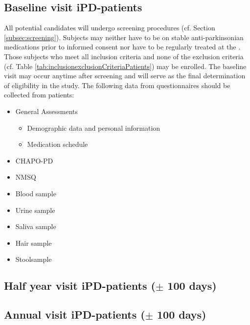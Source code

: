 \subsection{Baseline visit \ac{iPD}-patients}
All potential candidates will undergo screening procedures (cf. Section \ref{subsec:screening}). Subjects may neither have to be on stable anti-parkinsonian medications prior to informed consent nor have to be regularly treated at the \UKGM. Those subjects who meet all inclusion criteria and none of the exclusion criteria (cf. Table \ref{tab:inclusionexclusionCriteriaPatients}) may be enrolled. The baseline visit may occur anytime after screening and will serve as the final  determination of eligibility in the study. The following data from questionnaires should be collected from patients:
\begin{itemize}
\item General Assessments
\begin{itemize}
\item Demographic data and personal information
\item Medication schedule
\end{itemize}
\item \ac{CHAPO-PD}
\item \ac{NMSQ}
\item Blood sample
\item Urine sample
\item Saliva sample
\item Hair sample
\item Stoolsample
\end{itemize}

\subsection{Half year visit \ac{iPD}-patients ($\pm$ 100 days)}
\subsection{Annual visit \ac{iPD}-patients ($\pm$ 100 days)}
 
